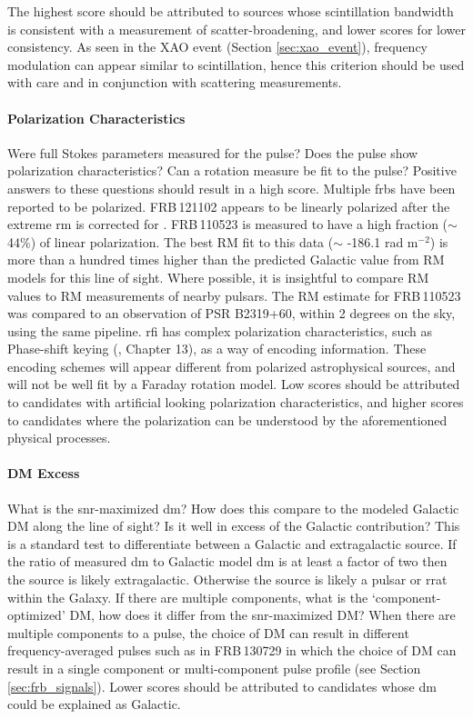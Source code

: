 \documentclass[a4paper,fleqn,usenatbib]{mnras}
\begin{document}
The highest score should be attributed to sources whose scintillation bandwidth
is consistent with a measurement of scatter-broadening, and lower scores for
lower consistency. As seen in the XAO event (Section \ref{sec:xao_event}),
frequency modulation can appear similar to scintillation, hence this criterion
should be used with care and in conjunction with scattering measurements. 

\paragraph{Polarization Characteristics}

Were full Stokes parameters measured for the pulse? Does the pulse show
polarization characteristics? Can a rotation measure be fit to the pulse?
Positive answers to these questions should result in a high score.  Multiple
\glspl{frb} have been reported to be polarized.  FRB\,121102 appears to be
linearly polarized after the extreme \gls{rm} is corrected for
\citep{2018Natur.553..182M}. FRB\,110523 is measured to have a high fraction
($\sim$ 44\%) of linear polarization. The best RM fit to this data ($\sim$
-186.1 rad m$^{-2}$) is more than a hundred times higher than the predicted
Galactic value from RM models for this line of sight. Where possible, it is
insightful to compare RM values to RM measurements of nearby pulsars. The RM
estimate for FRB\,110523 was compared to an observation of PSR B2319+60, within
2 degrees on the sky, using the same pipeline.  \gls{rfi} has complex
polarization characteristics, such as Phase-shift keying
(\cite{horowitz2015art}, Chapter 13), as a way of encoding information.  These
encoding schemes will appear different from polarized astrophysical sources, and
will not be well fit by a Faraday rotation model. Low scores should be
attributed to candidates with artificial looking polarization characteristics,
and higher scores to candidates where the polarization can be understood by the
aforementioned physical processes.

\paragraph{DM Excess}

What is the \gls{snr}-maximized \gls{dm}? How does this compare to the modeled
Galactic DM along the line of sight? Is it well in excess of the Galactic
contribution? This is a standard test to differentiate between a Galactic and
extragalactic source. If the ratio of measured \gls{dm} to Galactic model
\gls{dm} is at least a factor of two then the source is likely extragalactic.
Otherwise the source is likely a pulsar or \gls{rrat} within the Galaxy.  If
there are multiple components, what is the `component-optimized' DM, how does it
differ from the \gls{snr}-maximized DM? When there are multiple components to a
pulse, the choice of DM can result in different frequency-averaged pulses such
as in FRB\,130729 in which the choice of DM can result in a single component or
multi-component pulse profile (see Section \ref{sec:frb_signals}). Lower scores
should be attributed to candidates whose \gls{dm} could be explained as
Galactic.
\end{document}
